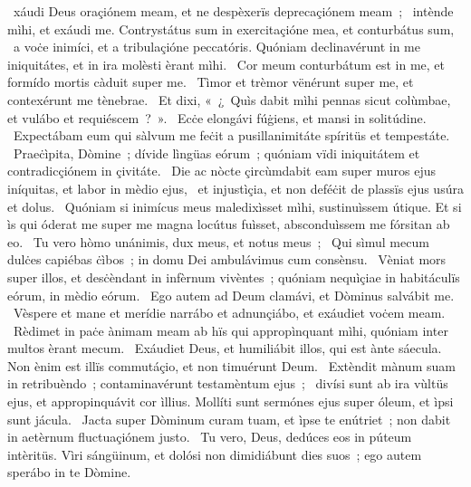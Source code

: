 \psalmChapterWithInscription{}
{ }
{%
~xáudi Deus oraçiónem meam, et ne despèxerïs deprecaçiónem meam~; 
~intènde mìhi, et exáudi me. Contrystátus sum in exercitaçióne mea, et conturbátus sum, 
~a voċe inimíci, et a tribulaçióne peccatóris. Quóniam declinavérunt in me iniquitátes, et in ira molèsti èrant mìhi. 
~Cor meum conturbátum est in me, et formído mortis càduit super me. 
~Tìmor et trèmor vënérunt super me, et contexérunt me tènebrae. 
~Et dixi, «~¿~Quìs dabit mìhi pennas sicut colùmbae, et vulábo et requiéscem~?~». 
~Ecċe elongávi fúġiens, et mansi in solitúdine. 
~Expectábam eum qui sàlvum me feċit a pusillanimitáte spíritüs et tempestáte. 
~Praeċìpita, Dòmine~; dívide lìngüas eórum~; quóniam vïdi iniquitátem et contradicçiónem in çivitáte. 
~Die ac nòcte çircùmdabit eam super muros ejus iníquitas, et labor in mèdio ejus, 
~et injustìçia, et non deféċit de plassïs ejus usúra et dolus. 
~Quóniam si inimícus meus maledixìsset mìhi, sustinuìssem útique. Et si ìs qui óderat me super me magna locútus fuìsset, absconduìssem me fórsitan ab eo. 
~Tu vero hòmo unánimis, dux meus, et notus meus~; 
~Qui sìmul mecum dulċes capiébas ċìbos~; in domu Dei ambulávimus cum consènsu. 
~Vèniat mors super illos, et desċèndant in infèrnum vivèntes~; quóniam nequìçiae in habitáculïs eórum, in mèdio eórum. 
~Ego autem ad Deum clamávi, et Dòminus salvábit me. 
~Vèspere et mane et merídie narrábo et adnunçiábo, et exáudiet voċem meam. 
~Rèdimet in paċe ànimam meam ab hïs qui appropìnquant mìhi, quóniam inter multos èrant mecum. 
~Exáudiet Deus, et humiliábit illos, qui est ànte sáecula. Non ènim est illïs commutáçio, et non timuérunt Deum. 
~Extèndit mànum suam in retribuèndo~; contaminavérunt testamèntum ejus~; 
~divísi sunt ab ira vùltüs ejus, et appropinquávit cor ìllius. Mollíti sunt sermónes ejus super óleum, et ìpsi sunt jácula. 
~Jacta super Dòminum curam tuam, et ìpse te enútriet~; non dabit in aetèrnum fluctuaçiónem justo. 
~Tu vero, Deus, dedúces eos in púteum intèritüs. Vìri sángüinum, et dolósi non dimidiábunt dies suos~; ego autem sperábo in te Dòmine. 
}

